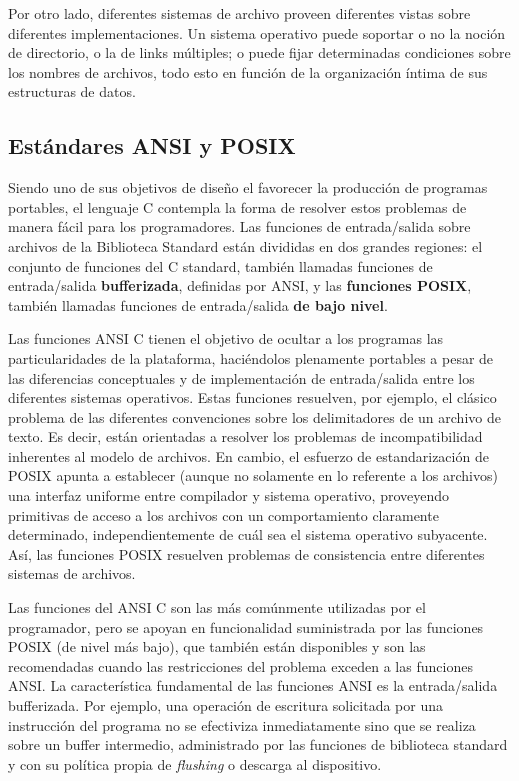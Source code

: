 Por otro lado, diferentes sistemas de archivo proveen diferentes vistas sobre
diferentes implementaciones. Un sistema operativo puede soportar o no la noción
de directorio, o la de links múltiples; o puede fijar determinadas condiciones
sobre los nombres de archivos, todo esto en función de la organización íntima
de sus estructuras de datos.

\subsection{Estándares ANSI y POSIX}
Siendo uno de sus objetivos de diseño el favorecer la producción de
programas portables, el lenguaje C contempla la forma de resolver estos problemas de
manera fácil para los programadores. Las funciones de entrada/salida sobre
archivos de la Biblioteca Standard están divididas en dos grandes regiones: el
conjunto de funciones del C standard, también llamadas funciones de 
entrada/salida \textbf{bufferizada}, definidas por ANSI, y las 
\textbf{funciones POSIX}, también llamadas
funciones de entrada/salida \textbf{de bajo nivel}.

Las funciones ANSI C tienen el objetivo de ocultar a los programas las
particularidades de la plataforma, haciéndolos plenamente portables a pesar de
las diferencias conceptuales y de implementación de entrada/salida entre los
diferentes sistemas operativos. Estas funciones resuelven, por ejemplo, el
clásico problema de las diferentes convenciones sobre los delimitadores de un
archivo de texto. Es decir, están orientadas a resolver los problemas de
incompatibilidad inherentes al modelo de archivos. En cambio, el esfuerzo de
estandarización de POSIX apunta a establecer (aunque no solamente en lo
referente a los archivos) una interfaz uniforme entre compilador y sistema
operativo, proveyendo primitivas de acceso a los archivos con un comportamiento
claramente determinado, independientemente de cuál sea el sistema operativo
subyacente. Así, las funciones POSIX resuelven problemas de consistencia entre
diferentes sistemas de archivos.

Las funciones del ANSI C son las más comúnmente utilizadas por el programador,
pero se apoyan en funcionalidad suministrada por las funciones POSIX (de nivel
más bajo), que también están disponibles y son las recomendadas cuando las
restricciones del problema exceden a las funciones ANSI. La característica
fundamental de las funciones ANSI es la entrada/salida bufferizada. Por
ejemplo, una operación de escritura solicitada por una instrucción del programa
no se efectiviza inmediatamente sino que se realiza sobre un buffer intermedio,
administrado por las funciones de biblioteca standard y con su política propia
de \textit{flushing} o descarga al dispositivo. 

